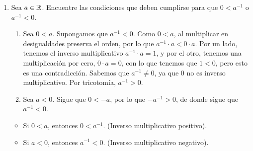 \begin{enumerate}[label=\alph*)]

 \item Sea $a\in \mathbb{R}$. Encuentre las condiciones que deben cumplirse para que $0<a^{-1}$ o $a^{-1}<0$.
 
 \begin{enumerate}[label=\roman*)]
  \item Sea $0<a$. Supongamos que $a^{-1}<0$. Como $0<a$, al multiplicar en desigualdades preserva el orden, por lo que $a^{-1} \cdot a<0 \cdot a$. Por un lado, tenemos el inverso multiplicativo $a^{-1} \cdot a = 1$, y por el otro, tenemos una multiplicación por cero, $0\cdot a=0$, con lo que tenemos que $1<0$, pero esto es una contradicción. Sabemos que $a^{-1}\neq 0$, ya que $0$ no es inverso multiplicativo. Por tricotomía, $a^{-1}>0$.
  \item Sea $a<0$. Sigue que $0<-a$, por lo que $-a^{-1}>0$, de donde sigue que $a^{-1}<0$.
 \end{enumerate}

 \begin{itemize}
  \item Si $0<a$, entonces $0<a^{-1}$. (Inverso multiplicativo positivo).
  \item Si $a<0$, entonces $a^{-1}<0$. (Inverso multiplicativo negativo).
 \end{itemize}
 

  

\end{enumerate}
